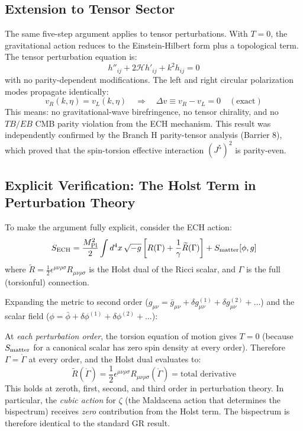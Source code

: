\documentclass[a4paper,11pt]{article}
\newcommand{\Mpl}{M_{\rm Pl}}
\begin{document}
\subsection{Extension to Tensor Sector}

The same five-step argument applies to tensor perturbations. With $T = 0$, the gravitational action reduces to the Einstein-Hilbert form plus a topological term. The tensor perturbation equation is:
\begin{equation}
h''_{ij} + 2\mathcal{H}h'_{ij} + k^2 h_{ij} = 0
\end{equation}
with no parity-dependent modifications. The left and right circular polarization modes propagate identically:
\begin{equation}
v_R(k,\eta) = v_L(k,\eta) \quad \Rightarrow \quad \Delta v \equiv v_R - v_L = 0 \quad (\text{exact})
\end{equation}
This means: no gravitational-wave birefringence, no tensor chirality, and no $TB/EB$ CMB parity violation from the ECH mechanism. This result was independently confirmed by the Branch H parity-tensor analysis (Barrier 8), which proved that the spin-torsion effective interaction $(J^5)^2$ is parity-even.

\subsection{Explicit Verification: The Holst Term in Perturbation Theory}

To make the argument fully explicit, consider the ECH action:
\begin{equation}
S_{\rm ECH} = \frac{\Mpl^2}{2}\int d^4x\, \sqrt{-g}\left[R(\Gamma) + \frac{1}{\gamma}\widetilde{R}(\Gamma)\right] + S_{\rm matter}[\phi, g]
\end{equation}
where $\widetilde{R} = \frac{1}{2}\epsilon^{\mu\nu\rho\sigma}R_{\mu\nu\rho\sigma}$ is the Holst dual of the Ricci scalar, and $\Gamma$ is the full (torsionful) connection.

Expanding the metric to second order ($g_{\mu\nu} = \bar{g}_{\mu\nu} + \delta g^{(1)}_{\mu\nu} + \delta g^{(2)}_{\mu\nu} + \ldots$) and the scalar field ($\phi = \bar{\phi} + \delta\phi^{(1)} + \delta\phi^{(2)} + \ldots$):

At \emph{each perturbation order}, the torsion equation of motion gives $T = 0$ (because $S_{\rm matter}$ for a canonical scalar has zero spin density at every order). Therefore $\Gamma = \mathring{\Gamma}$ at every order, and the Holst dual evaluates to:
\begin{equation}
\widetilde{R}(\mathring{\Gamma}) = \frac{1}{2}\epsilon^{\mu\nu\rho\sigma}R_{\mu\nu\rho\sigma}(\mathring{\Gamma}) = \text{total derivative}
\end{equation}
This holds at zeroth, first, second, and third order in perturbation theory. In particular, the \emph{cubic action} for $\zeta$ (the Maldacena action that determines the bispectrum) receives \emph{zero} contribution from the Holst term. The bispectrum is therefore identical to the standard GR result.
\end{document}
